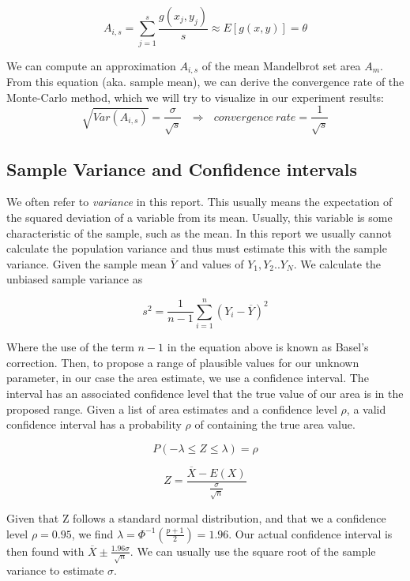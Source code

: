 \documentclass{article}
\begin{document}
    \begin{equation}
        A_{i,s} = \sum_{j=1}^{s} \frac{g(x_j,y_j)}{s} \approx E[g(x, y)] = \theta
    \end{equation}

    We can compute an approximation $A_{i,s}$ of the mean Mandelbrot set area $A_m$.\\

    From this equation (aka. sample mean), we can derive the convergence rate of the Monte-Carlo method, which we will try to visualize in our experiment results:
    \begin{equation}
        \sqrt{Var(A_{i,s})} = \frac{\sigma}{\sqrt{s}}\ \ \ \Rightarrow \ \ \ convergence\ rate = \frac{1}{\sqrt{s}}
    \end{equation}

    \subsection*{Sample Variance and Confidence intervals}

    We often refer to \emph{variance} in this report. This usually means the expectation of the squared deviation of a variable from its mean. Usually, this variable is some characteristic of the sample, such as the mean. In this report we usually cannot calculate the population variance and thus must estimate this with the sample variance. Given the sample mean $\overline{Y}$ and values of $Y_1, Y_2 .. Y_N$. We calculate the unbiased sample variance as

    $$s^2 = \frac{1}{n - 1} \sum_{i=1}^{n}(Y_i - \overline{Y})^2 $$

    Where the use of the term $n-1$ in the equation above is known as Basel's correction. Then, to propose a range of plausible values for our unknown parameter, in our case the area estimate, we use a confidence interval. The interval has an associated confidence level that the true value of our area is in the proposed range.  Given a list of area estimates and a confidence level $\rho$, a valid confidence interval has a probability $\rho$ of containing the true area value.

    $$P(- \lambda \leq Z \leq \lambda ) = \rho$$

    $$ Z = \frac{\overline{X} - E(X)}{\frac{\sigma}{\sqrt{n}}} $$

    Given that Z follows a standard normal distribution, and that we a confidence level $\rho = 0.95$, we find $\lambda = \Phi^{-1}(\frac{p + 1}{2}) = 1.96$. Our actual confidence interval is then found with $\overline{X} \pm \frac{1.96 \sigma}{\sqrt{n}}$. We can usually use the square root of the sample variance to estimate $\sigma$.
\end{document}
